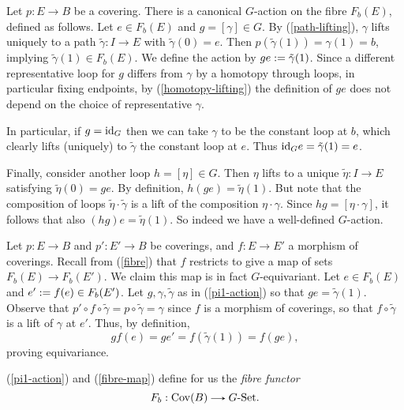 \begin{nothing}
  \label{pi1-action}
  Let $p : E \to B$ be a covering. There is a canonical $G$-action on
  the fibre $F_b(E)$, defined as follows. Let $e \in F_b(E)$ and $g =
  [\gamma] \in G$. By (\ref{path-lifting}), $\gamma$ lifts uniquely to
  a path $\tilde\gamma : I \to E$ with $\tilde\gamma(0) = e$. Then
  $p(\tilde\gamma(1)) = \gamma(1) = b$, implying $\tilde\gamma(1) \in
  F_b(E)$. We define the action by $ge \mathrel{:=}
  \tilde\gamma(1)$. Since a different representative loop for $g$
  differs from $\gamma$ by a homotopy through loops, in particular
  fixing endpoints, by (\ref{homotopy-lifting}) the definition of $ge$
  does not depend on the choice of representative $\gamma$.

  In particular, if $g = \mathrm{id}_G$ then we can take $\gamma$ to be the
  constant loop at $b$, which clearly lifts (uniquely) to
  $\tilde\gamma$ the constant loop at $e$. Thus $\mathrm{id}_G e =
  \tilde\gamma(1) = e$.

  Finally, consider another loop $h = [\eta] \in G$. Then $\eta$ lifts
  to a unique $\tilde\eta : I \to E$ satisfying $\tilde\eta(0) =
  ge$. By definition, $h(ge) = \tilde\eta(1)$. But note that the
  composition of loops $\tilde\eta \cdot \tilde\gamma$ is a lift of
  the composition $\eta \cdot \gamma$. Since $hg = [\eta \cdot
    \gamma]$, it follows that also $(hg)e = \tilde\eta(1)$. So indeed
  we have a well-defined $G$-action.
\end{nothing}

\begin{nothing}
  \label{fibre-map}
  Let $p : E \to B$ and $p' : E' \to B$ be coverings, and $f : E \to
  E'$ a morphism of coverings. Recall from (\ref{fibre}) that $f$
  restricts to give a map of sets $F_b(E) \to F_b(E')$. We claim this
  map is in fact $G$-equivariant. Let $e \in F_b(E)$ and $e' \mathrel{:=}
  f(e) \in F_b(E')$. Let $g,\gamma,\tilde\gamma$ as in
  (\ref{pi1-action}) so that $ge = \tilde\gamma(1)$. Observe that $p'
  \circ f \circ \tilde\gamma = p \circ \tilde \gamma = \gamma$ since
  $f$ is a morphism of coverings, so that $f \circ \tilde\gamma$ is a
  lift of $\gamma$ at $e'$. Thus, by definition,
  \[
  gf(e) = ge' = f(\tilde\gamma(1)) = f(ge),
  \]
  proving equivariance.
\end{nothing}

\begin{definition}
  (\ref{pi1-action}) and (\ref{fibre-map}) define for us the
  \emph{fibre functor}
  \[
  F_b : \Cov(B) \to G\dash\Set.
  \]
\end{definition}

